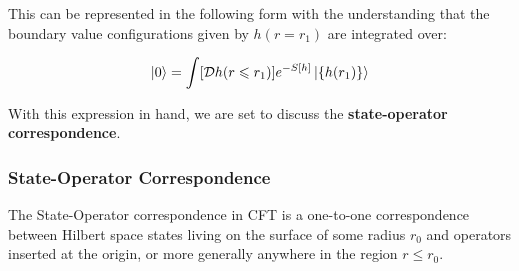   This can be represented in the following form with the understanding that the boundary value configurations given by $h(r=r_1)$ are integrated over:
  
  \begin{align} \label{ch2:vac}
   \ket{0} = \int [\mathcal{D}h(r \leqslant r_1)] e^{-S[h]} \ket{\{h(r_1)\}}
  \end{align}

  
  With this expression in hand, we are set to discuss the \textbf{state-operator correspondence}.
  
  \subsubsection{State-Operator Correspondence}
  The State-Operator correspondence in CFT is a one-to-one correspondence between Hilbert space states living on the surface of some radius $r_0$ and operators inserted at the origin, or more generally anywhere in the region $r \leqslant r_0$. 
  
  
  
